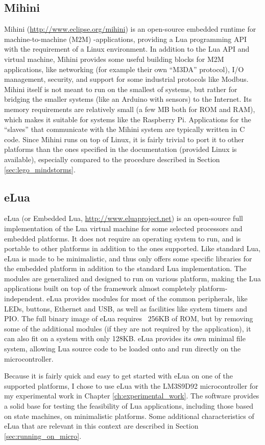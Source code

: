 \subsection{Mihini}
\label{sec:mihini}
Mihini (\url{http://www.eclipse.org/mihini}) is an open-source embedded runtime for machine-to-machine (M2M) -applications, providing a Lua programming API with the requirement of a Linux environment. In addition to the Lua API and virtual machine, Mihini provides some useful building blocks for M2M applications, like networking (for example their own “M3DA” protocol), I/O management, security, and support for some industrial protocols like Modbus. Mihini itself is not meant to run on the smallest of systems, but rather for bridging the smaller systems (like an Arduino with sensors) to the Internet. Its memory requirements are relatively small (a few MB both for ROM and RAM), which makes it suitable for systems like the Raspberry Pi. Applications for the “slaves” that communicate with the Mihini system are typically written in C code. Since Mihini runs on top of Linux, it is fairly trivial to port it to other platforms than the ones specified in the documentation (provided Linux is available), especially compared to the procedure described in Section \ref{sec:lego_mindstorms}.

\subsection{eLua}
\label{sec:elua}
eLua (or Embedded Lua, \url{http://www.eluaproject.net}) is an open-source full implementation of the Lua virtual machine for some selected processors and embedded platforms. It does not require an operating system to run, and is portable to other platforms in addition to the ones supported. Like standard Lua, eLua is made to be minimalistic, and thus only offers some specific libraries for the embedded platform in addition to the standard Lua implementation. The modules are generalized and designed to run on various platform, making the Lua applications built on top of the framework almost completely platform-independent. eLua provides modules for most of the common peripherals, like LEDs, buttons, Ethernet and USB, as well as facilities like system timers and PIO. The full binary image of eLua requires ~256KB of ROM, but by removing some of the additional modules (if they are not required by the application), it can also fit on a system with only 128KB. eLua provides its own minimal file system, allowing Lua source code to be loaded onto and run directly on the microcontroller.

Because it is fairly quick and easy to get started with eLua on one of the supported platforms, I chose to use eLua with the LM3S9D92 microcontroller for my experimental work in Chapter \ref{ch:experimental_work}. The software provides a solid base for testing the feasibility of Lua applications, including those based on state machines, on minimalistic platforms. Some additional characteristics of eLua that are relevant in this context are described in Section \ref{sec:running_on_micro}.